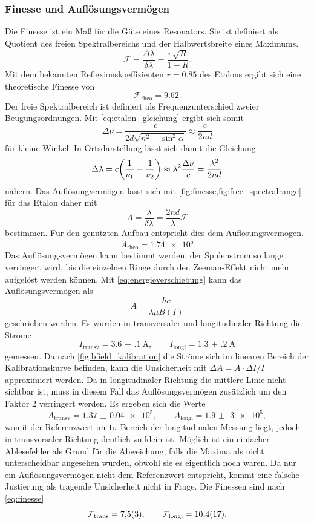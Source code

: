 \subsubsection{Finesse und Auflösungsvermögen}
Die Finesse ist ein Maß für die Güte eines Resonators. Sie ist definiert als Quotient 
des freien Spektralbereichs und der Halbwertsbreite eines Maximums. 
\begin{equation}
    \mathcal F = \frac{\Delta\lambda}{\delta \lambda} = \frac{\pi\sqrt R}{1-R}.
    \label{fig:finesse}
\end{equation}
Mit dem bekannten Reflexionskoeffizienten $r=0.85$ des Etalons ergibt sich eine theoretische Finesse 
von 
\[\mathcal F_\mathrm{theo} = \num{9.62}.\]
Der freie Spektralbereich ist definiert als Frequenzunterschied zweier Beugungsordnungen. 
Mit \cref{eq:etalon_gleichung} ergibt sich somit 
\begin{equation*}
    \Delta\nu = \frac{c}{2d\sqrt{n^2-\sin^2\alpha}} \approx \frac{c}{2nd}
\end{equation*}
für kleine Winkel. In Ortsdarstellung lässt sich damit die Gleichung 
\begin{equation}
    \Delta\lambda = c\qty(\frac{1}{\nu_1} - \frac{1}{\nu_2})\approx \lambda^2\frac{\Delta\nu}{c}
        =  \frac{\lambda^2}{2nd}
    \label{fig:free_spectralrange}
\end{equation}
nähern. Das Auflösungvermögen lässt sich mit \cref{fig:finesse,fig:free_spectralrange} 
für das Etalon daher mit
\begin{equation}
    A = \frac{\lambda}{\delta\lambda} = \frac{2nd}{\lambda}\mathcal F
    \label{eq:finesse}
\end{equation}
bestimmen. Für den genutzten Aufbau entspricht dies dem Auflösungsvermögen.
\[A_\mathrm{theo} = \num{1.74e5}\]
Das Auflösungsvermögen kann bestimmt werden, der Spulenstrom so lange 
verringert wird, bis die einzelnen Ringe durch den Zeeman-Effekt nicht mehr aufgelöst werden 
können. Mit \cref{eq:energieverschiebung} kann das Auflösungsvermögen als 
\[A = \frac{hc}{\lambda\mu B(I)}\]
geschrieben werden. Es wurden in transversaler und longitudinaler Richtung 
die Ströme 
\[I_\mathrm{transv} = \SI{3.6(1)}{\ampere},
\qquad I_\mathrm{longi} = \SI{1.3(2)}{\ampere}\]
gemessen. Da nach \cref{fig:bfield_kalibration} die Ströme sich im linearen Bereich 
der Kalibrationskurve befinden, kann die Unsicherheit mit 
$\Delta A = A\cdot\Delta I/I$
approximiert werden. Da in longitudinaler Richtung die mittlere Linie nicht sichtbar ist, muss 
in diesem Fall das Auflösungsvermögen zusätzlich um den Faktor 2 verringert werden.
Es ergeben sich die Werte 
\[A_\mathrm{transv} = \num{1.37(4)e5}, \qquad A_\mathrm{longi} = \num{1.9(3)e5},\]
womit der Referenzwert im $1\sigma$-Bereich der longitudinalen Messung liegt, jedoch 
in transversaler Richtung deutlich zu klein ist. Möglich ist ein einfacher 
Ablesefehler als Grund für die Abweichung, falls die Maxima als nicht unterscheidbar 
angesehen wurden, obwohl sie es eigentlich noch waren. Da nur 
ein Auflösungsvermögen nicht dem Referenzwert entspricht, kommt eine falsche Justierung 
als tragende Unsicherheit nicht in Frage. 
Die Finessen sind nach \cref{eq:finesse}
\[\mathcal F_\mathrm{trans} = \num{7.5\pm.3},\qquad \mathcal F_\mathrm{longi} = \num{10.4\pm1.7}.\]


